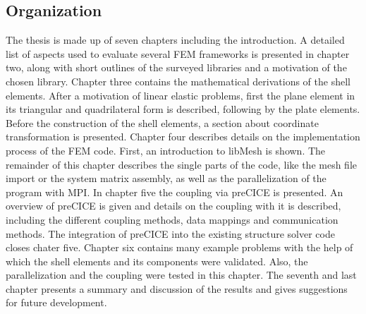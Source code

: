 \subsection{Organization}
The thesis is made up of seven chapters including the introduction. A detailed list of aspects used to evaluate several FEM frameworks is presented in chapter two, along with short outlines of the surveyed libraries and a motivation of the chosen library. Chapter three contains the mathematical derivations of the shell elements. After a motivation of linear elastic problems, first the plane element in its triangular and quadrilateral form is described, following by the plate elements. Before the construction of the shell elements, a section about coordinate transformation is presented. Chapter four describes details on the implementation process of the FEM code. First, an introduction to libMesh is shown. The remainder of this chapter describes the single parts of the code, like the mesh file import or the system matrix assembly, as well as the parallelization of the program with MPI. In chapter five the coupling via preCICE is presented. An overview of preCICE is given and details on the coupling with it is described, including the different coupling methods, data mappings and communication methods. The integration of preCICE into the existing structure solver code closes chater five. Chapter six contains many example problems with the help of which the shell elements and its components were validated. Also, the parallelization and the coupling were tested in this chapter. The seventh and last chapter presents a summary and discussion of the results and gives suggestions for future development.

\newpage
